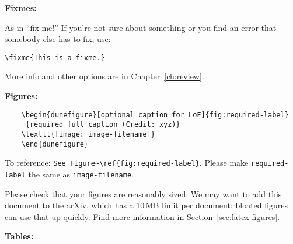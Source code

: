 \textbf{Fixmes:}

\begin{framed}
As in ``fix me!'' If you're not sure about something or you find an error that somebody else has to fix, use:
\begin{verbatim}
\fixme{This is a fixme.}
\end{verbatim}
More info and other options are in Chapter~\ref{ch:review}.
\end{framed}

\textbf{Figures:}

\begin{framed}
\begin{verbatim}
    \begin{dunefigure}[optional caption for LoF]{fig:required-label}
     {required full caption (Credit: xyz)}
    \texttt{[image: image-filename]}
    \end{dunefigure}
\end{verbatim}
To reference: \verb|See Figure~\ref{fig:required-label}|.
Please make \verb|required-label| the same as \verb|image-filename|. 

Please check that your figures are reasonably sized. We may want to add this document to the arXiv, which has a 10\,MB limit per document; bloated figures can use that up quickly. Find more information in Section~\ref{sec:latex-figures}.
\end{framed}

\textbf{Tables:}

